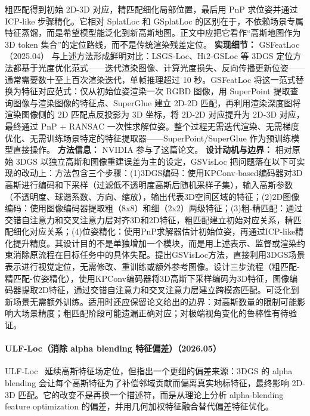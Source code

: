 粗匹配得到初始 2D-3D 对应，精匹配细化局部位置，最后用 PnP 求位姿并通过 ICP-like 步骤精化。它相对 SplatLoc 和 GSplatLoc 的区别在于，不依赖场景专属特征蒸馏，而是希望模型能泛化到新高斯地图。正文中应把它看作“高斯地图作为 3D token 集合”的定位路线，而不是传统渲染残差定位。
\textbf{实现细节：} GSFeatLoc（2025.04） 与上述方法形成鲜明对比：LSGS-Loc、Hi$^{}2$-GSLoc 等 3DGS 定位方法都基于光度优化范式——迭代渲染图像、计算光度损失、反向传播更新位姿——通常需要数十至上百次渲染迭代，单帧推理超过 10 秒。GSFeatLoc 将这一范式替换为特征对应范式：仅从初始位姿渲染一次 RGBD 图像，用 SuperPoint 提取查询图像与渲染图像的特征点、SuperGlue 建立 2D-2D 匹配，再利用渲染深度图将渲染图像侧的 2D 匹配点反投影为 3D 坐标，将 2D-2D 对应提升为 2D-3D 对应，最终通过 PnP + RANSAC 一次性求解位姿。整个过程无需迭代渲染、无需梯度优化、无需训练场景特定的特征提取器——SuperPoint/SuperGlue 作为预训练模型直接操作。
\textbf{方法信息：} NVIDIA 参与了这篇论文。
\textbf{设计动机与边界：} 相对原始 3DGS 以独立高斯和图像重建误差为主的设定，GSVisLoc 把问题落在以下可实现的改动上：方法包含三个步骤：(1)3DGS编码：使用KPConv-based编码器对3D高斯进行编码和下采样（过滤低不透明度高斯后随机采样子集），输入高斯参数（不透明度、球谐系数、方向、缩放），输出代表3D空间区域的特征；(2)2D图像编码：使用图像编码器提取粗（8x8）和细（2x2）两级特征；(3)粗-精匹配：通过交错自注意力和交叉注意力层对齐3D和2D特征，粗匹配建立初始对应关系，精匹配细化对应关系；(4)位姿精化：使用PnP求解器估计初始位姿，再通过ICP-like精化提升精度。其设计目的不是单独增加一个模块，而是用上述表示、监督或渲染约束消除原流程在目标任务中的具体失配。提出GSVisLoc方法，直接利用3DGS场景表示进行视觉定位，无需修改、重训练或额外参考图像。设计三步流程（粗匹配-精匹配-位姿精化），使用KPConv编码器将3D高斯下采样编码为3D特征，图像编码器提取2D特征，通过交错自注意力和交叉注意力层建立跨模态匹配。可泛化到新场景无需额外训练。适用时还应保留论文给出的边界：对高斯数量的限制可能影响大场景精度；粗匹配阶段可能遗漏正确对应；对极端视角变化的鲁棒性有待验证。
\paragraph{ULF-Loc（消除 alpha blending 特征偏差）（2026.05）}
ULF-Loc~\cite{2605_04730} 延续高斯特征场定位，但指出一个更细的偏差来源：3DGS 的 alpha blending 会让每个高斯特征为了补偿邻域贡献而偏离真实地标特征，最终影响 2D-3D 匹配。它的改变不是再换一个描述符，而是从理论上分析 alpha-blending feature optimization 的偏差，并用几何加权特征融合替代偏差特征优化。

